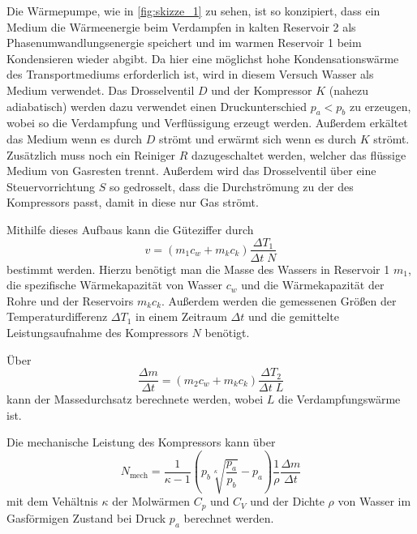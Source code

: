Die Wärmepumpe, wie in \autoref{fig:skizze_1} zu sehen, ist so konzipiert, dass ein Medium die Wärmeenergie beim Verdampfen in kalten Reservoir 2 als Phasenumwandlungsenergie speichert und im warmen Reservoir 1 beim Kondensieren wieder abgibt.
Da hier eine möglichst hohe Kondensationswärme des Transportmediums erforderlich ist, wird in diesem Versuch Wasser als Medium verwendet.
Das Drosselventil $D$ und der Kompressor $K$ (nahezu adiabatisch) werden dazu verwendet einen Druckunterschied $p_a < p_b$ zu erzeugen, wobei so die Verdampfung und Verflüssigung erzeugt werden.
Außerdem erkältet das Medium wenn es durch $D$ strömt und erwärmt sich wenn es durch $K$ strömt.
Zusätzlich muss noch ein Reiniger $R$ dazugeschaltet werden, welcher das flüssige Medium von Gasresten trennt. 
Außerdem wird das Drosselventil über eine Steuervorrichtung $S$ so gedrosselt, dass die Durchströmung zu der des Kompressors passt, damit in diese nur Gas strömt.

Mithilfe dieses Aufbaus kann die Güteziffer durch
\begin{equation}
    v = (m_1 c_w + m_k c_k) \frac{\Delta T_1}{\Delta t \; N}
    \label{eq:gueteziffer_2}
\end{equation}
bestimmt werden. 
Hierzu benötigt man die Masse des Wassers in Reservoir 1 $m_1$, die spezifische Wärmekapazität von Wasser $c_w$ und die Wärmekapazität der Rohre und der Reservoirs $m_k c_k$.
Außerdem werden die gemessenen Größen der Temperaturdifferenz $\Delta T_1$ in einem Zeitraum $\Delta t$ und die gemittelte Leistungsaufnahme des Kompressors $N$ benötigt.\cite{V206}

Über
\begin{equation}
    \frac{\Delta m}{\Delta t} = (m_2 c_w + m_k c_k) \frac{\Delta T_2}{\Delta t \; L}
\end{equation}
kann der Massedurchsatz berechnete werden, wobei $L$ die Verdampfungswärme ist.

Die mechanische Leistung des Kompressors kann über
\begin{equation}
    N_\text{mech} = \frac{1}{\kappa - 1} \left( p_b \sqrt[\kappa]{\frac{p_a}{p_b}} - p_a \right) \frac{1}{\rho} \frac{\Delta m}{\Delta t}
\end{equation}
mit dem Vehältnis $\kappa$ der Molwärmen $C_p$ und $C_V$ und der Dichte $\rho$ von Wasser im Gasförmigen Zustand bei Druck $p_a$ berechnet werden.\cite{V206}